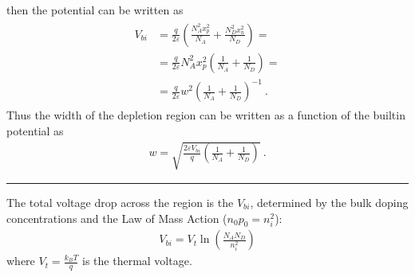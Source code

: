 \documentclass[letterpaper,10pt,english]{jupyterBook}
\begin{document}
\sphinxAtStartPar
then the potential can be written as
\begin{equation*}
\begin{split}\begin{aligned}
  V_{bi}
  & = \frac{q}{2 \varepsilon} \left( \frac{N_A^2 x_p^2}{N_A} + \frac{N_D^2 x_n^2}{N_D} \right) = \\
  & = \frac{q}{2 \varepsilon} N_A^2 x_p^2 \left( \frac{1}{N_A} + \frac{1}{N_D} \right) = \\
  & = \frac{q}{2 \varepsilon} w^2 \left( \frac{1}{N_A} + \frac{1}{N_D} \right)^{-1} \ .
\end{aligned}\end{split}
\end{equation*}
\sphinxAtStartPar
Thus the width of the depletion region can be written as a function of the built\sphinxhyphen{}in potential as
\begin{equation*}
\begin{split}w = \sqrt{\frac{2 \varepsilon V_{bi}}{q} \left( \frac{1}{N_A} + \frac{1}{N_D} \right)} \ .\end{split}
\end{equation*}

\bigskip\hrule\bigskip


\sphinxAtStartPar
{} 

\sphinxAtStartPar
The total voltage drop across the region is the  \(V_{bi}\), determined by the bulk doping concentrations and the Law of Mass Action (\(n_0 p_0 = n_i^2\)):
\begin{equation*}
\begin{split}V_{bi} = V_t \ln\left(\frac{N_A N_D}{n_i^2}\right)\end{split}
\end{equation*}
\sphinxAtStartPar
where \(V_t = \frac{k_B T}{q}\) is the thermal voltage.
\end{document}
